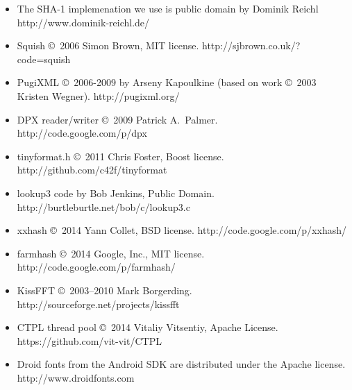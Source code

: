 \begin{itemize}
\item The SHA-1 implemenation we use is public domain by
Dominik Reichl \\ {\cf http://www.dominik-reichl.de/}
\item Squish \copyright\ 2006 Simon Brown, MIT license.
{\cf http://sjbrown.co.uk/?code=squish}
\item PugiXML \copyright\ 2006-2009 by Arseny Kapoulkine (based on work
\copyright\ 2003 Kristen Wegner). {\cf http://pugixml.org/}
\item DPX reader/writer \copyright\ 2009 Patrick A.\ Palmer.
{\cf http://code.google.com/p/dpx}
\item {\cf tinyformat.h} \copyright\ 2011 Chris Foster, Boost
    license. {\cf http://github.com/c42f/tinyformat}
\item {\cf lookup3} code by Bob Jenkins, Public Domain.
{\cf http://burtleburtle.net/bob/c/lookup3.c}
\item {\cf xxhash} \copyright\ 2014 Yann Collet, BSD license.
{\cf http://code.google.com/p/xxhash/}
\item {\cf farmhash} \copyright\ 2014 Google, Inc., MIT license.
{\cf http://code.google.com/p/farmhash/}
\item {\cf KissFFT} \copyright\ 2003--2010 Mark Borgerding.
{\cf http://sourceforge.net/projects/kissfft}
\item {\cf CTPL} thread pool \copyright\ 2014 Vitaliy Vitsentiy, Apache License.
{\cf https://github.com/vit-vit/CTPL}
\item Droid fonts from the Android SDK are distributed under the
    Apache license. \\ {\cf http://www.droidfonts.com}
\end{itemize}

